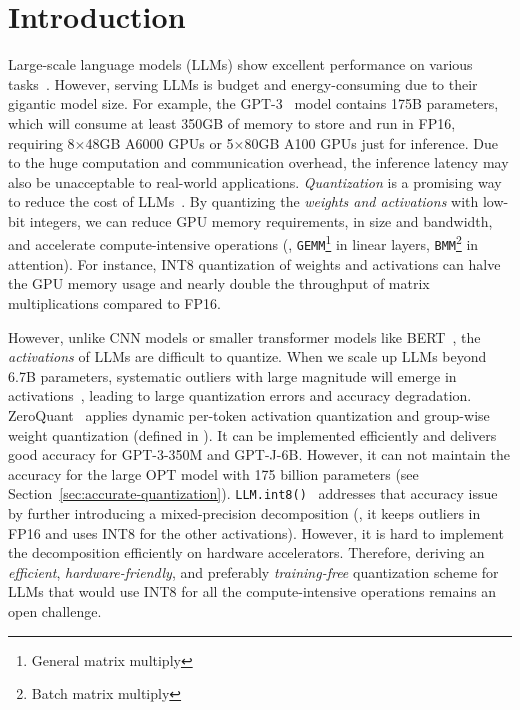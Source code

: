 \section{Introduction}
Large-scale language models (LLMs) show excellent performance on various tasks~\citep{gpt3,opt}. However, serving LLMs is budget and energy-consuming due to their gigantic model size. For example, the GPT-3~\citep{gpt3} model contains 175B parameters, which will consume at least 350GB of memory to store and run in FP16, requiring 8$\times$48GB A6000 GPUs or 5$\times$80GB A100 GPUs just for inference.
Due to the huge computation and communication overhead, the inference latency may also be unacceptable to real-world applications.
\emph{Quantization} is a promising way to reduce the cost of LLMs~\cite{dettmers2022llmint8, zeroquant}. By quantizing the \emph{weights and activations} with low-bit integers, we can reduce GPU memory requirements, in size and bandwidth, and accelerate compute-intensive operations (\ie, \texttt{GEMM}\footnote{General matrix multiply} in linear layers, \texttt{BMM}\footnote{Batch matrix multiply} in attention). For instance, INT8 quantization of weights and activations can halve the GPU memory usage and nearly double the throughput of matrix multiplications compared to FP16.



However, unlike CNN models or smaller transformer models like BERT~\cite{bert}, the \emph{activations} of LLMs are difficult to quantize. When we scale up LLMs beyond 6.7B parameters, systematic outliers with large magnitude will emerge in activations~\cite{dettmers2022llmint8}, leading to large quantization errors and accuracy degradation.
ZeroQuant~\citep{zeroquant} applies dynamic per-token activation quantization and group-wise weight quantization (defined in  ). It can be implemented efficiently and delivers good accuracy for GPT-3-350M and GPT-J-6B. However,  it can not maintain the accuracy for the large OPT model with 175 billion parameters (see Section~\ref{sec:accurate-quantization}).
\texttt{LLM.int8()}~\cite{dettmers2022llmint8} addresses that accuracy issue by further introducing a mixed-precision decomposition (\ie, it keeps outliers in FP16 and uses INT8 for the other activations). However, it is hard to implement the decomposition efficiently on hardware accelerators.
Therefore, deriving an \emph{efficient}, \emph{hardware-friendly}, and preferably \emph{training-free} quantization scheme for LLMs that would use INT8 for all the compute-intensive operations remains an open challenge.

